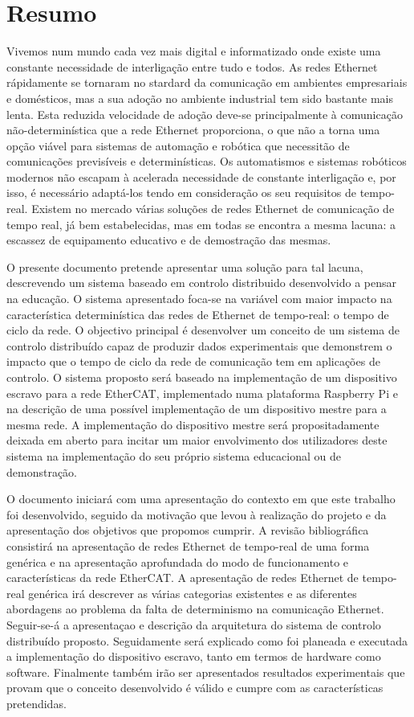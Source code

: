 \chapter*{Resumo}
Vivemos num mundo cada vez mais digital e informatizado onde existe uma constante necessidade de interligação entre tudo e todos.
As redes Ethernet rápidamente se tornaram no stardard da comunicação em ambientes empresariais e domésticos, mas a sua adoção no ambiente industrial tem sido bastante mais lenta.
Esta reduzida velocidade de adoção deve-se principalmente à comunicação não-determinística que a rede Ethernet proporciona, o que não a torna uma opção viável para sistemas de automação e robótica que necessitão de comunicações previsíveis e determinísticas.
Os automatismos e sistemas robóticos modernos não escapam à acelerada necessidade de constante interligação e, por isso, é necessário adaptá-los tendo em consideração os seu requisitos de tempo-real.
Existem no mercado várias soluções de redes Ethernet de comunicação de tempo real, já bem estabelecidas, mas em todas se encontra a mesma lacuna: a escassez de equipamento educativo e de demostração das mesmas.

O presente documento pretende apresentar uma solução para tal lacuna, descrevendo um sistema baseado em controlo distribuido desenvolvido a pensar na educação.
O sistema apresentado foca-se na variável com maior impacto na característica determinística das redes de Ethernet de tempo-real: o tempo de ciclo da rede.
O objectivo principal é desenvolver um conceito de um sistema de controlo distribuído capaz de produzir dados experimentais que demonstrem o impacto que o tempo de ciclo da rede de comunicação tem em aplicações de controlo.
O sistema proposto será baseado na implementação de um dispositivo escravo para a rede EtherCAT, implementado numa plataforma Raspberry Pi e na descrição de uma possível implementação de um dispositivo mestre para a mesma rede.
A implementação do dispositivo mestre será propositadamente deixada em aberto para incitar um maior envolvimento dos utilizadores deste sistema na implementação do seu próprio sistema educacional ou de demonstração.

O documento iniciará com uma apresentação do contexto em que este trabalho foi desenvolvido, seguido da motivação que levou à realização do projeto e da apresentação dos objetivos que propomos cumprir.
A revisão bibliográfica consistirá na apresentação de redes Ethernet de tempo-real de uma forma genérica e na apresentação aprofundada do modo de funcionamento e características da rede EtherCAT.
A apresentação de redes Ethernet de tempo-real genérica irá descrever as várias categorias existentes e as diferentes abordagens ao problema da falta de determinismo na comunicação Ethernet.
Seguir-se-á a apresentaçao e descrição da arquitetura do sistema de controlo distribuído proposto.
Seguidamente será explicado como foi planeada e executada a implementação do dispositivo escravo, tanto em termos de hardware como software.
Finalmente também irão ser apresentados resultados experimentais que provam que o conceito desenvolvido é válido e cumpre com as características pretendidas.

